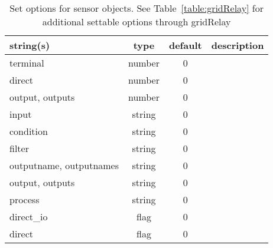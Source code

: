 \begin{table}[ht]
\centering
\begin{tabular}{p{5cm} c c p{7cm}}
\hline
string(s) & type & default & description \\
\hline
terminal & number & 0 & \\
direct & number & 0 & \\
output, outputs & number & 0 & \\
input & string & 0 & \\
condition & string & 0 & \\
filter & string & 0 & \\
outputname, outputnames & string & 0 & \\
output, outputs & string & 0 & \\
process & string & 0 & \\
direct\_io & flag & 0 & \\
direct & flag & 0 & \\
\hline
\end{tabular}
\caption{Set options for sensor objects. See Table~\ref{table:gridRelay} for additional settable options through gridRelay}
\label{table:sensor}
\end{table}


